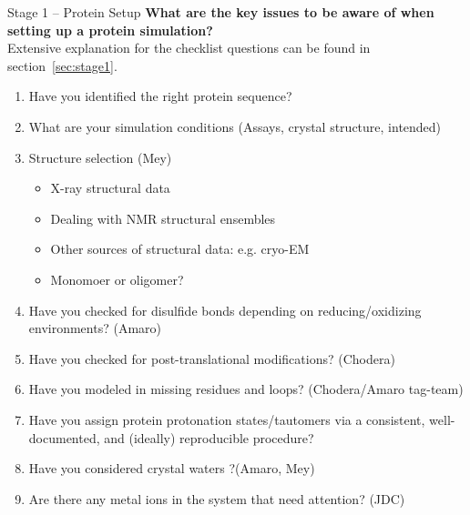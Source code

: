 \documentclass[9pt,bestpractices]{livecoms}
\begin{document}
\begin{Checklists*}[p!]
\begin{checklist}{Stage 1 -- Protein Setup}
\textbf{What are the key issues to be aware of when setting up a protein simulation?}\\
Extensive explanation for the checklist questions can be found in section~\ref{sec:stage1}.
\begin{enumerate}
\item Have you identified the right protein sequence?
\item What are your simulation conditions (Assays, crystal structure, intended) 
\item Structure selection (Mey) 
    \begin{itemize}
    \item  X-ray structural data
    \item Dealing with NMR structural ensembles
    \item Other sources of structural data: e.g. cryo-EM
    \item Monomoer or oligomer?
    \end{itemize}
\item Have you checked for disulfide bonds depending on reducing/oxidizing environments? (Amaro)
\item Have you checked for post-translational modifications? (Chodera)
\item Have you modeled in missing residues and loops? (Chodera/Amaro tag-team)
\item Have you assign protein protonation states/tautomers via a consistent, well-documented, and (ideally) reproducible procedure? 
\item Have you considered crystal waters ?(Amaro, Mey)
\item Are there any metal ions in the system that need attention? (JDC)
\end{enumerate}
\end{checklist}
\end{Checklists*}
\end{document}
